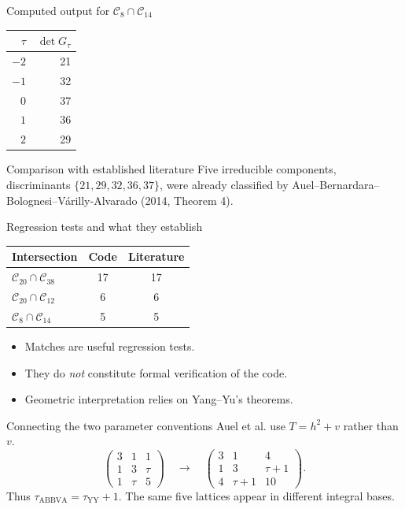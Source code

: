 \documentclass[aspectratio=169,11pt]{beamer}
\begin{document}
\begin{frame}{Computed output for $\mathcal C_8\cap\mathcal C_{14}$}
\centering
\begin{tabular}{rr}\toprule $\tau$&$\det G_\tau$\\\midrule $-2$&21\\$-1$&32\\$0$&37\\$1$&36\\$2$&29\\\bottomrule\end{tabular}
\vspace{1em}
\begin{block}{Comparison with established literature}
Five irreducible components, discriminants $\{21,29,32,36,37\}$, were already classified by Auel--Bernardara--Bolognesi--V\'arilly-Alvarado (2014, Theorem 4).
\end{block}
\end{frame}
\begin{frame}{Regression tests and what they establish}
\centering
\begin{tabular}{lcc}\toprule Intersection & Code & Literature\\\midrule
$\mathcal C_{20}\cap\mathcal C_{38}$ &17&17\\
$\mathcal C_{20}\cap\mathcal C_{12}$ &6&6\\
$\mathcal C_8\cap\mathcal C_{14}$ &5&5\\\bottomrule\end{tabular}
\vspace{1em}
\begin{itemize}\item Matches are useful regression tests.\item They do \emph{not} constitute formal verification of the code.\item Geometric interpretation relies on Yang--Yu's theorems.\end{itemize}
\end{frame}
\begin{frame}{Connecting the two parameter conventions}
Auel et al. use $T=h^2+v$ rather than $v$.
\[\begin{pmatrix}3&1&1\\1&3&\tau\\1&\tau&5\end{pmatrix}
\quad\longrightarrow\quad
\begin{pmatrix}3&1&4\\1&3&\tau+1\\4&\tau+1&10\end{pmatrix}.\]
Thus $\tau_{\mathrm{ABBVA}}=\tau_{\mathrm{YY}}+1$.
\vspace{0.7em}
\alert{The same five lattices appear in different integral bases.}
\end{frame}
\end{document}

